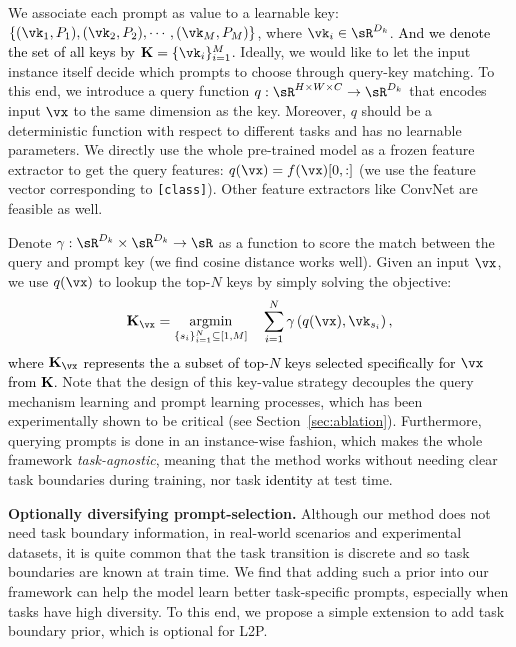 \documentclass[10pt,twocolumn,letterpaper]{article}
\newcommand{\zifeng}[1]{\textcolor{black}{#1}}
\newcommand{\methodabbr}{L2P\xspace}
\def\kk{\mathbf{K}}
\begin{document}
We associate each prompt as value to a learnable key: $\{(\vk_1, P_1), (\vk_2, P_2), \cdots, (\vk_M, P_M)\}$, where $\vk_i \in \sR ^{D_k}$. \zifeng{And we denote the set of all keys by $\kk = \{\vk_i\}_{i=1}^{M}$.} Ideally, we would like to let the input instance itself decide which prompts to choose through query-key matching. To this end, we introduce a query function $q: \sR ^{H \times W \times C} \to \sR ^{D_k}$ that encodes input $\vx$ to the same dimension as the key.
Moreover, $q$ should be a deterministic function with respect to different tasks and has no learnable parameters. We directly use the whole pre-trained model as a frozen feature extractor to get the query features: $q(\vx) = f(\vx)[0,:]$ (we use the feature vector corresponding to \verb|[class]|). Other feature extractors like ConvNet are feasible as well. 

Denote $\gamma: \sR ^{D_k} \times \sR ^{D_k} \to \sR$ as a function to score the match between the query and prompt key (we find cosine distance works well).
Given an input $\vx$, we use $q(\vx)$ to lookup the top-$N$ keys by simply solving the objective:
\begin{equation}
\label{eq:lookup}
    \zifeng{\kk_\vx} = \underset{\{s_i\}_{i=1}^{N} \subseteq [1, M] }{\operatorname{argmin}} \quad \sum_{i=1}^{N} \gamma\left({q(\vx), \vk_{s_i}}\right),
\end{equation}
\zifeng{where $\kk_\vx$ represents the a subset of top-$N$ keys selected specifically for $\vx$ from $\kk$.}
Note that the design of this key-value strategy decouples the query mechanism learning and prompt learning processes, which has been experimentally shown to be critical (see Section~\ref{sec:ablation}).
Furthermore, querying prompts is done in an instance-wise fashion, which makes the whole framework \emph{task-agnostic}, meaning that the method works without needing clear task boundaries during training, nor task \zifeng{identity} at test time.

\textbf{Optionally diversifying prompt-selection.} 
Although our method does not need task boundary information, in real-world scenarios and experimental datasets, it is quite common that the task transition is discrete and so task boundaries are known at train time. 
We find that adding such a prior into our framework can help the model learn better task-specific prompts, especially when tasks have high diversity. 
To this end, we propose a simple extension to add task boundary prior, which is optional for \methodabbr.
\end{document}
